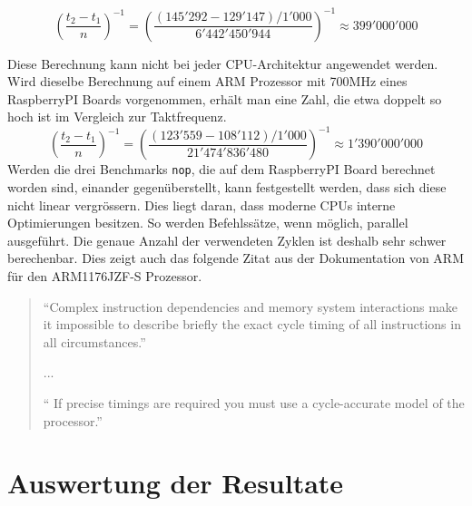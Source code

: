 \[ \left(\frac{t_2-t_1}{n}\right)^{-1} =  \left(\frac{(145'292-129'147)/1'000}{6'442'450'944}\right)^{-1} \approx 399'000'000 \]

Diese Berechnung kann nicht bei jeder CPU-Architektur angewendet werden. Wird dieselbe Berechnung auf einem ARM Prozessor mit 700MHz eines RaspberryPI Boards vorgenommen, erhält man eine Zahl, die etwa doppelt so hoch ist im Vergleich zur Taktfrequenz.
\[ \left(\frac{t_2-t_1}{n}\right)^{-1} =  \left(\frac{(123'559-108'112)/1'000}{21'474'836'480}\right)^{-1} \approx 1'390'000'000 \]
Werden die drei Benchmarks \texttt{nop}, die auf dem RaspberryPI Board berechnet worden sind, einander gegenüberstellt, kann festgestellt werden, dass sich diese nicht linear vergrössern. Dies liegt daran, dass moderne CPUs interne Optimierungen besitzen. So werden Befehlssätze, wenn möglich, parallel ausgeführt. Die genaue Anzahl der verwendeten Zyklen ist deshalb sehr schwer berechenbar. Dies zeigt auch das folgende Zitat aus der Dokumentation von ARM für den ARM1176JZF-S Prozessor.

\begin{quotation}
\enquote{Complex instruction dependencies and memory system interactions make it impossible to
describe briefly the exact cycle timing of all instructions in all circumstances.}
\par
...
\par
\enquote{ If precise timings are required you must use a cycle-accurate model of the processor.\cite{arm_datasheet}}
\end{quotation}



\section{Auswertung der Resultate}
\label{sec:auswertung_resultate}

